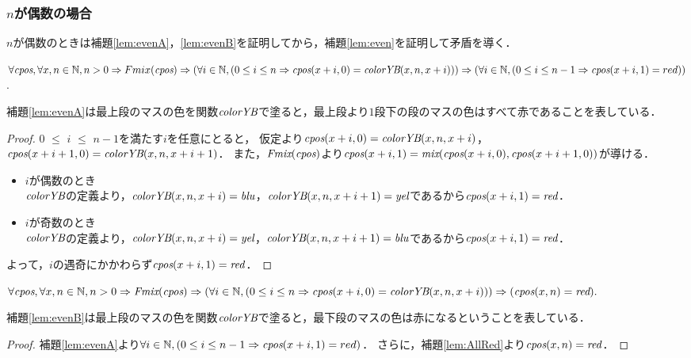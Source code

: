 \subsubsection{$n$が偶数の場合}
$n$が偶数のときは補題\ref{lem:evenA}，\ref{lem:evenB}を証明してから，補題\ref{lem:even}を証明して矛盾を導く．
\begin{lem}[\EvenA] \label{lem:evenA}
  $\forall \textit{cpos}, \forall x, n \in \mathbb{N}, n > 0  \Rightarrow Fmix(\textit{cpos}) \Rightarrow 
  (\forall i \in \mathbb{N}, (0 \leq i \leq n \Rightarrow \textit{cpos}(x+i,0) = \textit{colorYB}(x,n,x+i))) \Rightarrow
  (\forall i \in \mathbb{N}, (0 \leq i \leq n-1 \Rightarrow \textit{cpos}(x+i,1) = red))$.
\end{lem}
補題\ref{lem:evenA}は最上段のマスの色を関数$\textit{colorYB}$で塗ると，最上段より$1$段下の段のマスの色はすべて赤であることを表している．
\begin{proof}
  $0$ $\leq$ $i$ $\leq$ $n-1$を満たす$i$を任意にとると，
  仮定より$\textit{cpos}(x+i,0) = \textit{colorYB}(x,n,x+i)$，$\textit{cpos}(x+i+1,0) = \textit{colorYB}(x,n,x+i+1)$．
  また，$\textit{Fmix}(\textit{cpos})$より$\textit{cpos}(x+i,1) = \textit{mix}(\textit{cpos}(x+i,0),\textit{cpos}(x+i+1,0))$が導ける．
  \begin{itemize}
  \item
    $i$が偶数のとき \\
    $\textit{colorYB}$の定義より，$\textit{colorYB}(x,n,x+i)=\textit{blu}$，$\textit{colorYB}(x,n,x+i+1)=\textit{yel}$であるから$\textit{cpos}(x+i,1)=\textit{red}$．
  \item
    $i$が奇数のとき \\
    $\textit{colorYB}$の定義より，$\textit{colorYB}(x,n,x+i)=\textit{yel}$，$\textit{colorYB}(x,n,x+i+1)=\textit{blu}$であるから$\textit{cpos}(x+i,1)=\textit{red}$．
  \end{itemize}
  よって，$i$の遇奇にかかわらず$\textit{cpos}(x+i,1)=\textit{red}$．
\end{proof}
\begin{lem}[\EvenB] \label{lem:evenB}
  $\forall \textit{cpos}, \forall x, n \in \mathbb{N}, n > 0 \Rightarrow \textit{Fmix}(\textit{cpos}) \Rightarrow 
  (\forall i \in \mathbb{N}, (0 \leq i \leq n \Rightarrow \textit{cpos}(x+i,0) = \textit{colorYB}(x,n,x+i))) \Rightarrow
  (\textit{cpos}(x,n)=\textit{red}).$
\end{lem}
補題\ref{lem:evenB}は最上段のマスの色を関数$\textit{colorYB}$で塗ると，最下段のマスの色は赤になるということを表している．
\begin{proof}
  補題\ref{lem:evenA}より$\forall i \in \mathbb{N}, (0 \leq i \leq n-1 \Rightarrow \textit{cpos}(x+i,1) = red)$．
  さらに，補題\ref{lem:AllRed}より$\textit{cpos}(x,n)=\textit{red}$．
\end{proof}

